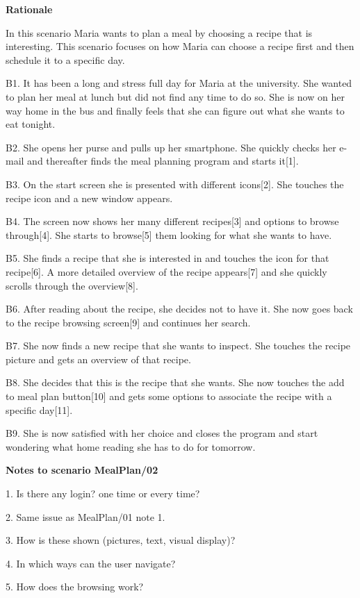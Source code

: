 \textbf{Rationale}

In this scenario Maria wants to plan a meal by choosing a recipe that is interesting. This scenario focuses on how Maria can choose a recipe first and then schedule it to a specific day.

	B1. It has been a long and stress full day for Maria at the university. She wanted to plan her meal at lunch but did not find any time to do so. She is now on her way home in the bus and finally feels that she can figure out what she wants to eat tonight.

	B2. She opens her purse and pulls up her smartphone. She quickly checks her e-mail and thereafter finds the meal planning program and starts it[1]. 

	B3. On the start screen she is presented with different icons[2]. She touches the recipe icon and a new window appears.

	B4. The screen now shows her many different recipes[3] and options to browse through[4]. She starts to browse[5] them looking for what she wants to have. 

	B5. She finds a recipe that she is interested in and touches the icon for that recipe[6]. A more detailed overview of the recipe appears[7] and she quickly scrolls through the overview[8].

	B6. After reading about the recipe, she decides not to have it. She now goes back to the recipe browsing screen[9] and continues her search.

	B7. She now finds a new recipe that she wants to inspect. She touches the recipe picture and gets an overview of that recipe. 

	B8. She decides that this is the recipe that she wants. She now touches the add to meal plan button[10] and gets some options to associate the recipe with a specific day[11].

	B9. She is now satisfied with her choice and closes the program and start wondering what home reading she has to do for tomorrow.
	
\textbf{Notes to scenario MealPlan/02}

1. Is there any login? one time or every time?

2. Same issue as MealPlan/01 note 1.

3. How is these shown (pictures, text, visual display)?

4. In which ways can the user navigate?

5. How does the browsing work?

